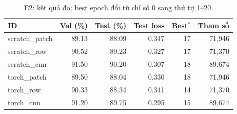 \begin{table}[htbp]
\centering\small
\caption{E2: kết quả đo; best epoch đổi từ chỉ số 0 sang thứ tự 1--20.}\label{tab:resultsE2}
\begin{lrbox}{\reporttable}\begin{tabular}{lrrrrr}
\toprule
ID & Val (\%) & Test (\%) & Test loss & Best$^*$ & Tham số \\
\midrule
scratch\_patch & 89.13 & 88.09 & 0.347 & 17 & 71,946 \\
scratch\_row & 90.52 & 89.23 & 0.327 & 17 & 71,370 \\
scratch\_cnn & 91.50 & 90.20 & 0.307 & 18 & 89,674 \\
torch\_patch & 89.50 & 88.04 & 0.330 & 18 & 71,946 \\
torch\_row & 90.33 & 88.34 & 0.341 & 14 & 71,370 \\
torch\_cnn & 91.20 & 89.75 & 0.295 & 15 & 89,674 \\
\bottomrule
\end{tabular}\end{lrbox}
\ifdim\wd\reporttable>\linewidth\resizebox{\linewidth}{!}{\usebox{\reporttable}}\else\usebox{\reporttable}\fi
\end{table}
